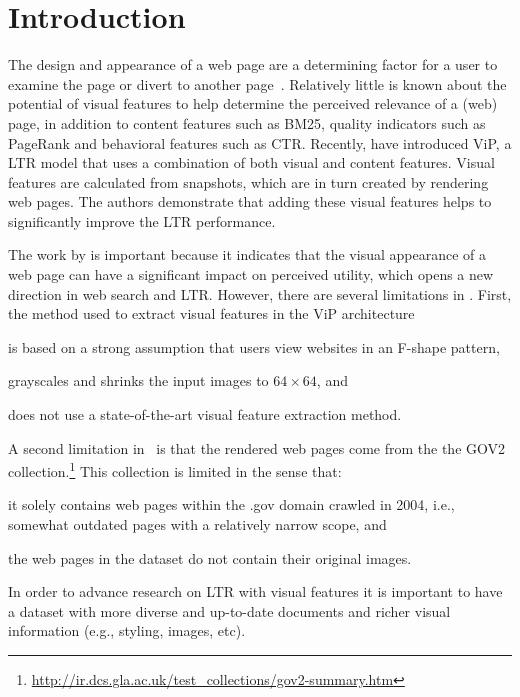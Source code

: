 
\section{Introduction}
The design and appearance of a web page are a determining factor for a user to examine the page or divert to another page~\cite{nielsen1999designing,nielsen2006f,pernice2017f,wang2014eye}.
Relatively little is known about the potential of visual features to help determine the perceived relevance of a (web) page, in addition to content features such as BM25, quality indicators such as PageRank and behavioral features such as CTR.
Recently, \citet{fan2017learning} have introduced ViP, a \ac{LTR} model that uses a combination of both visual and content features.
Visual features are calculated from snapshots, which are in turn created by rendering web pages.
The authors demonstrate that adding these visual features helps to significantly improve the \ac{LTR} performance.

The work by \citet{fan2017learning} is important because it indicates that the visual appearance of a web page can have a significant impact on perceived utility, which opens a new direction in web search and \ac{LTR}.
However, there are several limitations in \cite{fan2017learning}.
First, the method used to extract visual features in the ViP architecture
\begin{inparaenum}[(i)]
\item is based on a strong assumption that users view websites in an F-shape pattern, 
\item grayscales and shrinks the input images to $64\times64$, and
\item does not use a state-of-the-art visual feature extraction method.
\end{inparaenum}

A second limitation in~\citep{fan2017learning} is that
the rendered web pages come from the the GOV2 collection.\footnote{\url{http://ir.dcs.gla.ac.uk/test_collections/gov2-summary.htm}}
This collection is limited in the sense that:
\begin{inparaenum}[(i)]
\item it solely contains web pages within the .gov domain crawled in 2004, i.e., somewhat outdated pages with a relatively narrow scope, and
\item the web pages in the dataset do not contain their original images.
\end{inparaenum}
In order to advance research on \ac{LTR} with visual features it is important to have a dataset with more diverse and up-to-date documents and richer visual information (e.g., styling, images, etc).

